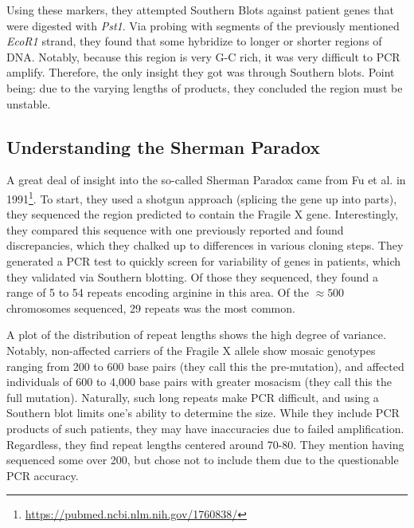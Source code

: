 Using these markers, they attempted Southern Blots against patient genes that were digested with \textit{Pst1}. Via probing with segments of the previously mentioned \textit{EcoR1} strand, they found that some hybridize to longer or shorter regions of DNA. Notably, because this region is very G-C rich, it was very difficult to PCR amplify. Therefore, the only insight they got was through Southern blots. Point being: due to the varying lengths of products, they concluded the region must be unstable.


\subsection*{Understanding the Sherman Paradox}

A great deal of insight into the so-called Sherman Paradox came from Fu et al. in 1991\footnote{\url{https://pubmed.ncbi.nlm.nih.gov/1760838/}}. To start, they used a shotgun approach (splicing the gene up into parts), they sequenced the region predicted to contain the Fragile X gene. Interestingly, they compared this sequence with one previously reported and found discrepancies, which they chalked up to differences in various cloning steps. They generated a PCR test to quickly screen for variability of genes in patients, which they validated via Southern blotting. Of those they sequenced, they found a range of 5 to 54 repeats encoding arginine in this area. Of the $\approx 500$ chromosomes sequenced, 29 repeats was the most common.\newline

A plot of the distribution of repeat lengths shows the high degree of variance. Notably, non-affected carriers of the Fragile X allele show mosaic genotypes ranging from 200 to 600 base pairs (they call this the pre-mutation), and affected individuals of 600 to 4,000 base pairs with greater mosacism (they call this the full mutation). Naturally, such long repeats make PCR difficult, and using a Southern blot limits one's ability to determine the size. While they include PCR products of such patients, they may have inaccuracies due to failed amplification. Regardless, they find repeat lengths centered around 70-80. They mention having sequenced some over 200, but chose not to include them due to the questionable PCR accuracy.\newline

